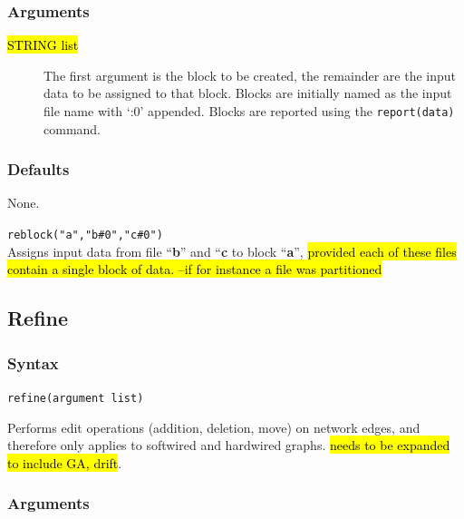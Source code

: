 	\subsubsection{Arguments}
	\begin{description}
		\item [\hl{STRING list}] The first argument is the block to be created, the remainder 
		are the input data to be assigned to that block. Blocks are initially named as the input 
		file name with `:0' appended. Blocks are reported using the \texttt{report(data)} command.
	\end{description}

	\subsubsection{Defaults}
		None.
	
	\begin{example}

		\item{\texttt{reblock("a","b\#0","c\#0")}\\ Assigns input data from file ``\textbf{b}'' and 
		``\textbf{c} to block ``\textbf{a}'', \hl{provided each of these files contain a single block 
		of data. --if for instance a file was partitioned}}
	
	\end{example}

\subsection{Refine}
\label{subsec:refine}
	\subsubsection{Syntax}
		\texttt{refine(argument list)}
		
	\begin{phygdescription}
		{Performs edit operations (addition, deletion, move) on network edges, and 
		therefore only applies to softwired and hardwired graphs. \hl{needs to be expanded 
		to include GA, drift}}.
	\end{phygdescription}

	\subsubsection{Arguments}
		
